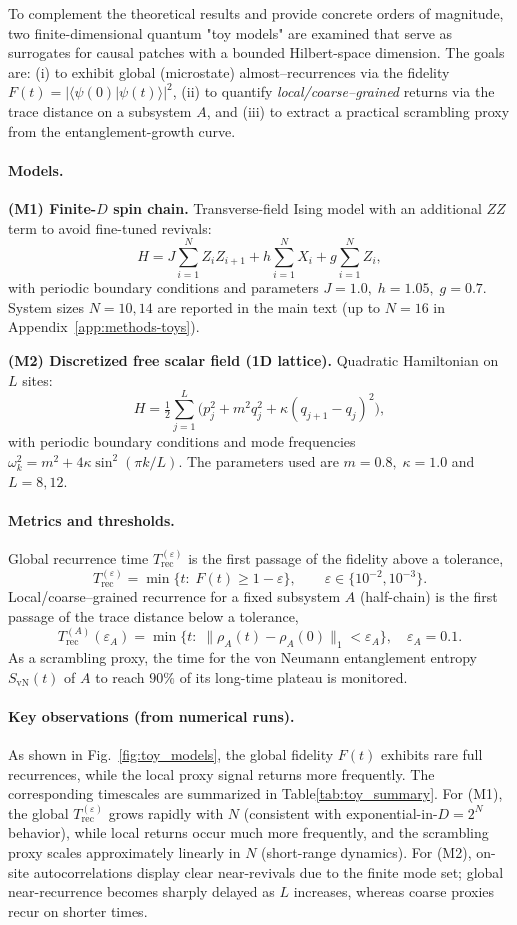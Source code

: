 \documentclass[12pt]{article}
\newcommand{\Trec}{T_{\text{rec}}}
\newcommand{\TrecA}{T^{(A)}_{\text{rec}}}
\theoremstyle{remark}
\begin{document}
To complement the theoretical results and provide concrete orders of magnitude, two finite-dimensional quantum "toy models" are examined that serve as surrogates for causal patches with a bounded Hilbert-space dimension. The goals are: (i) to exhibit global (microstate) almost–recurrences via the fidelity
\(
F(t)=|\langle\psi(0)|\psi(t)\rangle|^2
\),
(ii) to quantify \emph{local/coarse–grained} returns via the trace distance on a subsystem \(A\),
and (iii) to extract a practical scrambling proxy from the entanglement-growth curve.

\paragraph{Models.}
\textbf{(M1) Finite-$D$ spin chain.}
Transverse-field Ising model with an additional \(ZZ\) term to avoid fine-tuned revivals:
\[
H = J\sum_{i=1}^{N} Z_i Z_{i+1} + h\sum_{i=1}^{N} X_i + g\sum_{i=1}^{N} Z_i,
\]
with periodic boundary conditions and parameters \(J=1.0,\; h=1.05,\; g=0.7\).
System sizes \(N=10,14\) are reported in the main text (up to \(N=16\) in Appendix~\ref{app:methods-toys}).

\noindent
\textbf{(M2) Discretized free scalar field (1D lattice).}
Quadratic Hamiltonian on \(L\) sites:
\[
H=\tfrac12\sum_{j=1}^{L}\!\big(p_j^2+m^2 q_j^2+\kappa (q_{j+1}-q_j)^2\big),
\]
with periodic boundary conditions and mode frequencies
\(\omega_k^2=m^2+4\kappa\sin^2(\pi k/L)\).
The parameters used are \(m=0.8,\;\kappa=1.0\) and \(L=8,12\).

\paragraph{Metrics and thresholds.}
Global recurrence time \(\Trec^{(\varepsilon)}\) is the first passage of the fidelity above a tolerance,
\[
\Trec^{(\varepsilon)}=\min\{t:\; F(t)\ge 1-\varepsilon\},\qquad \varepsilon\in\{10^{-2},10^{-3}\}.
\]
Local/coarse–grained recurrence for a fixed subsystem \(A\) (half-chain) is the first passage of the trace distance below a tolerance,
\[
\TrecA(\varepsilon_A)=\min\{t:\;\|\rho_A(t)-\rho_A(0)\|_1<\varepsilon_A\},\quad \varepsilon_A=0.1.
\]
As a scrambling proxy, the time for the von Neumann entanglement entropy \(S_{\mathrm{vN}}(t)\) of \(A\) to reach \(90\%\) of its long-time plateau is monitored.

\paragraph{Key observations (from numerical runs).}
As shown in Fig.~\ref{fig:toy_models}, the global fidelity $F(t)$ exhibits rare full recurrences, while the local proxy signal returns more frequently. The corresponding timescales are summarized in Table\ref{tab:toy_summary}.
For (M1), the global \(\Trec^{(\varepsilon)}\) grows rapidly with \(N\) (consistent with exponential-in-\(D=2^N\) behavior),
while local returns occur much more frequently, and the scrambling proxy scales approximately linearly in \(N\) (short-range dynamics).
For (M2), on-site autocorrelations display clear near-revivals due to the finite mode set; global near-recurrence becomes sharply delayed as \(L\) increases, whereas coarse proxies recur on shorter times.
\end{document}
